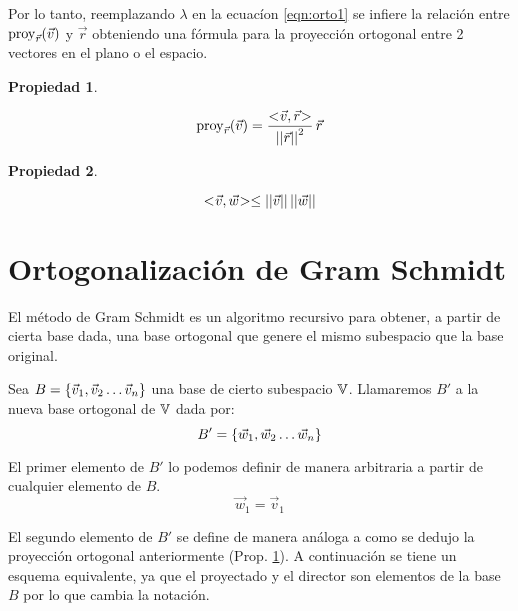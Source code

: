 \documentclass[a5paper,12pt,twoside]{book}
\newtheorem{prop}{{Propiedad}}[chapter]
\begin{document}
Por lo tanto, reemplazando $\lambda$ en la ecuacíon \ref{eqn:orto1} se infiere la relación entre $\operatorname{proy}_{\Vec{r}}(\Vec{v})$ y $\Vec{r}$ obteniendo una fórmula para la proyección ortogonal entre 2 vectores en el plano o el espacio.

\begin{mdframed}[style=PropertyFrame]
    \begin{prop}
        \label{prop:proyOrto}
    \end{prop}
    \begin{equation*}
        \operatorname{proy}_{\Vec{r}}(\Vec{v}) = \frac{<\hspace{-0.8mm}\Vec{v},\Vec{r}\hspace{-0.8mm}>}{{\left|\left| {\Vec{r}} \right|\right|}^2} \, \Vec{r}
    \end{equation*}
\end{mdframed}

\begin{mdframed}[style=PropertyFrame]
    \begin{prop}
    \end{prop}
    \begin{equation*}
        <\hspace{-0.8mm}\Vec{v},\Vec{w}\hspace{-0.8mm}> \leq {\left|\left| {\Vec{v}} \right|\right|} \, {\left|\left| {\Vec{w}} \right|\right|}
    \end{equation*}
\end{mdframed}


\section{Ortogonalización de Gram Schmidt}

El método de Gram Schmidt es un algoritmo recursivo para obtener, a partir de cierta base dada, una base ortogonal que genere el mismo subespacio que la base original.

Sea $B={ \left\{ {\Vec{v}_1 , \Vec{v}_2 \dots \Vec{v}_n} \right\} }$ una base de cierto subespacio $\mathbb{V}$.
Llamaremos $B'$ a la nueva base ortogonal de $\mathbb{V}$ dada por:
\begin{equation*}
    B' = { \left\{ {\Vec{w}_1 , \Vec{w}_2 \dots \Vec{w}_n} \right\} }
\end{equation*}

El primer elemento de $B'$ lo podemos definir de manera arbitraria a partir de cualquier elemento de $B$.
\begin{equation*}
    \Vec{w}_1 = \Vec{v}_1
\end{equation*}

El segundo elemento de $B'$ se define de manera análoga a como se dedujo la proyección ortogonal anteriormente (Prop. \ref{prop:proyOrto}).
A continuación se tiene un esquema equivalente, ya que el proyectado y el director son elementos de la base $B$ por lo que cambia la notación.
\end{document}
